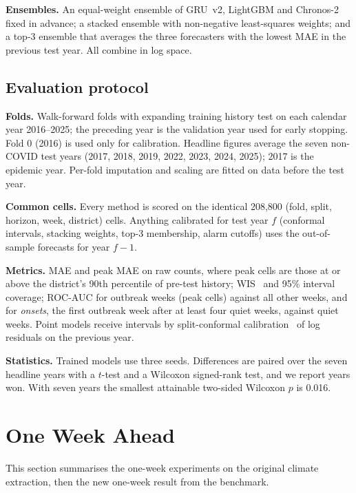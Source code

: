 \textbf{Ensembles.} An equal-weight ensemble of GRU~v2, LightGBM and Chronos-2 fixed in advance; a stacked ensemble with non-negative least-squares weights; and a top-3 ensemble that averages the three forecasters with the lowest MAE in the previous test year. All combine in log space.

\subsection{Evaluation protocol}
\textbf{Folds.} Walk-forward folds with expanding training history test on each calendar year 2016--2025; the preceding year is the validation year used for early stopping. Fold 0 (2016) is used only for calibration. Headline figures average the seven non-COVID test years (2017, 2018, 2019, 2022, 2023, 2024, 2025); 2017 is the epidemic year. Per-fold imputation and scaling are fitted on data before the test year.

\textbf{Common cells.} Every method is scored on the identical 208,800 (fold, split, horizon, week, district) cells. Anything calibrated for test year $f$ (conformal intervals, stacking weights, top-3 membership, alarm cutoffs) uses the out-of-sample forecasts for year $f-1$.

\textbf{Metrics.} MAE and peak MAE on raw counts, where peak cells are those at or above the district's 90th percentile of pre-test history; WIS~\cite{bracher2021evaluating} and 95\% interval coverage; ROC-AUC for outbreak weeks (peak cells) against all other weeks, and for \emph{onsets}, the first outbreak week after at least four quiet weeks, against quiet weeks. Point models receive intervals by split-conformal calibration~\cite{vovk2005algorithmic} of log residuals on the previous year.

\textbf{Statistics.} Trained models use three seeds. Differences are paired over the seven headline years with a $t$-test and a Wilcoxon signed-rank test, and we report years won. With seven years the smallest attainable two-sided Wilcoxon $p$ is 0.016.

\section{One Week Ahead}
\label{sec:h1}

This section summarises the one-week experiments on the original climate extraction, then the new one-week result from the benchmark.

